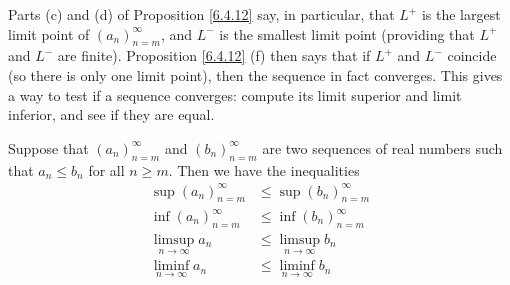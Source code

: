 \begin{note}
    Parts (c) and (d) of Proposition \ref{6.4.12} say, in particular, that \(L^+\) is the largest limit point of \((a_n)_{n = m}^\infty\), and \(L^-\) is the smallest limit point
    (providing that \(L^+\) and \(L^-\) are finite).
    Proposition \ref{6.4.12} (f) then says that if \(L^+\) and \(L^-\) coincide (so there is only one limit point), then the sequence in fact converges.
    This gives a way to test if a sequence converges: compute its limit superior and limit inferior, and see if they are equal.
\end{note}

\begin{lemma}\label{6.4.13}
    Suppose that \((a_n)_{n = m}^\infty\) and \((b_n)_{n = m}^\infty\) are two sequences of real numbers such that \(a_n \leq b_n\) for all \(n \geq m\).
    Then we have the inequalities
    \begin{align*}
        \sup(a_n)_{n = m}^\infty    & \leq \sup(b_n)_{n = m}^\infty    \\
        \inf(a_n)_{n = m}^\infty    & \leq \inf(b_n)_{n = m}^\infty    \\
        \limsup_{n \to \infty} a_n & \leq \limsup_{n \to \infty} b_n \\
        \liminf_{n \to \infty} a_n & \leq \liminf_{n \to \infty} b_n
    \end{align*}
\end{lemma}


